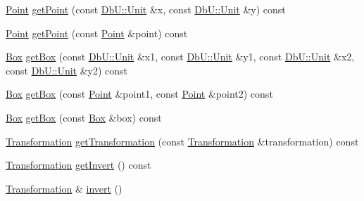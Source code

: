 \begin{DoxyCompactItemize}
\item 
\mbox{\hyperlink{classHurricane_1_1Point}{Point}} \mbox{\hyperlink{classHurricane_1_1Transformation_aea9a0f1d1ffeb4a38accbf0c9287a93f}{get\+Point}} (const \mbox{\hyperlink{group__DbUGroup_ga4fbfa3e8c89347af76c9628ea06c4146}{Db\+U\+::\+Unit}} \&x, const \mbox{\hyperlink{group__DbUGroup_ga4fbfa3e8c89347af76c9628ea06c4146}{Db\+U\+::\+Unit}} \&y) const
\item 
\mbox{\hyperlink{classHurricane_1_1Point}{Point}} \mbox{\hyperlink{classHurricane_1_1Transformation_a002347125ae10c408aa5e74d3c36d62f}{get\+Point}} (const \mbox{\hyperlink{classHurricane_1_1Point}{Point}} \&point) const
\item 
\mbox{\hyperlink{classHurricane_1_1Box}{Box}} \mbox{\hyperlink{classHurricane_1_1Transformation_a1335b209ff017d8bfd6f81ae65ae6cd7}{get\+Box}} (const \mbox{\hyperlink{group__DbUGroup_ga4fbfa3e8c89347af76c9628ea06c4146}{Db\+U\+::\+Unit}} \&x1, const \mbox{\hyperlink{group__DbUGroup_ga4fbfa3e8c89347af76c9628ea06c4146}{Db\+U\+::\+Unit}} \&y1, const \mbox{\hyperlink{group__DbUGroup_ga4fbfa3e8c89347af76c9628ea06c4146}{Db\+U\+::\+Unit}} \&x2, const \mbox{\hyperlink{group__DbUGroup_ga4fbfa3e8c89347af76c9628ea06c4146}{Db\+U\+::\+Unit}} \&y2) const
\item 
\mbox{\hyperlink{classHurricane_1_1Box}{Box}} \mbox{\hyperlink{classHurricane_1_1Transformation_a4d3ad1601d31e05c76bda4b417445aff}{get\+Box}} (const \mbox{\hyperlink{classHurricane_1_1Point}{Point}} \&point1, const \mbox{\hyperlink{classHurricane_1_1Point}{Point}} \&point2) const
\item 
\mbox{\hyperlink{classHurricane_1_1Box}{Box}} \mbox{\hyperlink{classHurricane_1_1Transformation_a051ddd67572c50b3b8edf75f790006e2}{get\+Box}} (const \mbox{\hyperlink{classHurricane_1_1Box}{Box}} \&box) const
\item 
\mbox{\hyperlink{classHurricane_1_1Transformation}{Transformation}} \mbox{\hyperlink{classHurricane_1_1Transformation_a12ba0cbe9154661e704ce0f2638f860f}{get\+Transformation}} (const \mbox{\hyperlink{classHurricane_1_1Transformation}{Transformation}} \&transformation) const
\item 
\mbox{\hyperlink{classHurricane_1_1Transformation}{Transformation}} \mbox{\hyperlink{classHurricane_1_1Transformation_af9b37e39fb0ba02655eba41fe7779990}{get\+Invert}} () const
\item 
\mbox{\hyperlink{classHurricane_1_1Transformation}{Transformation}} \& \mbox{\hyperlink{classHurricane_1_1Transformation_a4d49d9fde0fe04eba9e8f0c7360f2c79}{invert}} ()
\item 

\end{DoxyCompactItemize}
